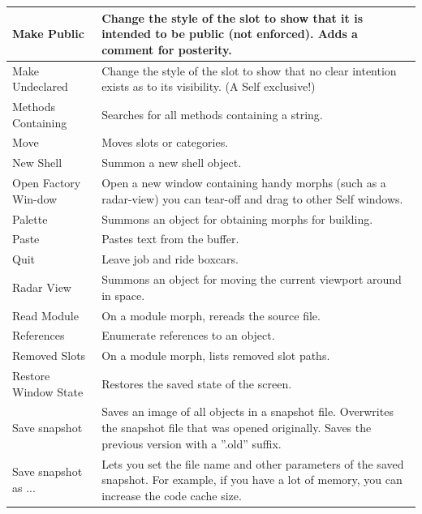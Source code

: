 \documentclass[letterpaper,10pt,english]{sphinxmanual}
\begin{document}
\begin{longtable}{p{5cm} p{10cm}}
Make Public
 & 
Change the style of the slot to show that it is intended to be public (not enforced). Adds a comment for posterity.
\\\hline

Make Undeclared
 & 
Change the style of the slot to show that no clear intention exists as to its visibility. (A Self exclusive!)
\\\hline

Methods Containing
 & 
Searches for all methods containing a string.
\\\hline

Move
 & 
Moves slots or categories.
\\\hline

New Shell
 & 
Summon a new shell object.
\\\hline

Open Factory Win-dow
 & 
Open a new window containing handy morphs (such as a radar-view) you can tear-off and drag to other Self windows.
\\\hline

Palette
 & 
Summons an object for obtaining morphs for building.
\\\hline

Paste
 & 
Pastes text from the buffer.
\\\hline

Quit
 & 
Leave job and ride boxcars.
\\\hline

Radar View
 & 
Summons an object for moving the current viewport around in space.
\\\hline

Read Module
 & 
On a module morph, rereads the source file.
\\\hline

References
 & 
Enumerate references to an object.
\\\hline

Removed Slots
 & 
On a module morph, lists removed slot paths.
\\\hline

Restore Window State
 & 
Restores the saved state of the screen.
\\\hline

Save snapshot
 & 
Saves an image of all objects in a snapshot file. Overwrites the snapshot file that was opened originally. Saves the previous version with a ''.old'' suffix.
\\\hline

Save snapshot as ...
 & 
Lets you set the file name and other parameters of the saved snapshot. For example, if you have a lot of memory, you can increase the code cache size.
\\\hline


\end{longtable}
\end{document}
